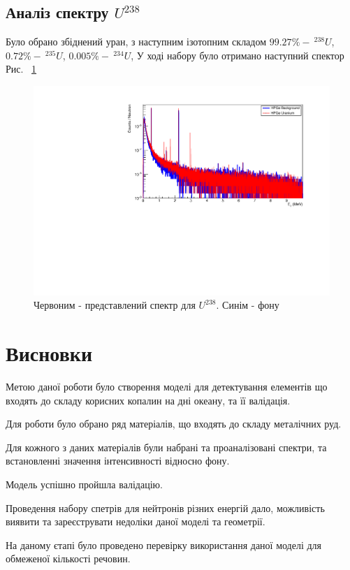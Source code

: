 \documentclass[a4paper, 14pt]{article}
\numberwithin{equation}{section}
\numberwithin{table}{section}
\begin{document}
	\subsection{Аналіз спектру $U^{238}$}
	Було обрано збіднений уран, з наступним ізотопним складом $99.27\% -\  ^{238}U$, $ 0.72\% - \  ^{235}U$, $ 0.005\% - \ ^{234}U$, У ході набору було отримано наступний спектор Рис. ~\ref{ris:poorU}
	\begin{figure}[hbt!]
		\centering \includegraphics[width=1\textwidth]{res/poorUranium.pdf}
		\caption{Червоним - представлений спектр для $U^{238}$. Синім - фону} 
		\label{ris:poorU}	
	\end{figure} 	
	
	\newpage 
	\section{Висновки}
	\setcounter{figure}{0}
Метою даної роботи було створення моделі для детектування елементів що входять до складу корисних копалин на дні океану, та її валідація.
	
Для роботи було обрано ряд матеріалів, що входять до складу металічних руд.

Для кожного з даних матеріалів були набрані та проаналізовані спектри, та встановленні значення інтенсивності відносно фону. 

Модель успішно пройшла валідацію.  

Проведення набору спетрів для нейтронів різних енергій дало, можливість виявити та зареєструвати недоліки даної моделі та геометрії. 

На даному єтапі було проведено перевірку використання даної моделі для обмеженої кількості речовин. 
\end{document}
